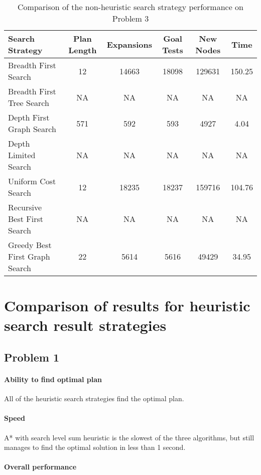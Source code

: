 \documentclass[11pt]{article}
\begin{document}
\begin{table}[H]
  \centering
  \caption{Comparison of the non-heuristic search strategy performance on Problem 3}
  \bigskip
  \label{table:nhp3}
  \bgroup
  \def\arraystretch{1.5}
  \begin{tabular}{l|c|c|c|c|c}
    Search Strategy & Plan Length & Expansions & Goal Tests & New Nodes & Time \\
    \hline
    Breadth First Search & 12 & 14663 & 18098 & 129631 & 150.25 \\
    Breadth First Tree Search & NA & NA & NA & NA & NA \\
    Depth First Graph Search & 571 & 592 & 593 & 4927 & 4.04 \\
    Depth Limited Search & NA & NA & NA & NA & NA \\
    Uniform Cost Search & 12 & 18235 & 18237 & 159716 & 104.76 \\
    Recursive Best First Search & NA & NA & NA & NA & NA \\
    Greedy Best First Graph Search & 22 & 5614 & 5616 & 49429 & 34.95
  \end{tabular}
  \egroup
\end{table}

\section{Comparison of results for heuristic search result strategies}

\subsection{Problem 1}

\paragraph{Ability to find optimal plan}

All of the heuristic search strategies find the optimal plan.

\paragraph{Speed}

A* with search level sum heuristic is the slowest of the three algorithms, but still manages to find the optimal solution in less than 1 second.

\paragraph{Overall performance}
\end{document}
